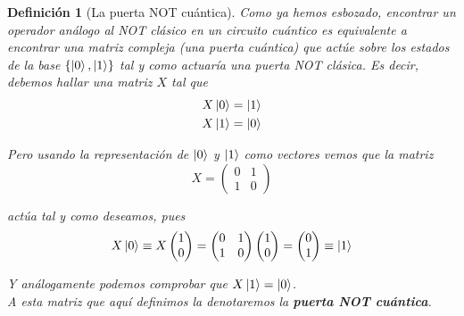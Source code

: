 \documentclass[11pt, spanish]{report}
\numberwithin{equation}{section}
\newtheorem{defin}{Definición}[section]
\numberwithin{defin}{section}
\begin{document}
\begin{defin}[La puerta NOT cuántica] Como ya hemos esbozado, encontrar un operador análogo al NOT clásico en un circuito cuántico es equivalente a encontrar una matriz compleja (una puerta cuántica) que actúe sobre los estados de la base $\{\ket{0},\ket{1}\}$ tal y como actuaría una puerta NOT clásica. Es decir, debemos hallar una matriz $X$ tal que
\begin{equation}
\begin{split}
X\ket{0}=\ket{1}\\
X\ket{1}=\ket{0}
\end{split}
\end{equation}

Pero usando la representación de $\ket{0}$ y $\ket{1}$ como vectores vemos que la matriz
\begin{equation}
X=\begin{pmatrix}
0 & 1\\
1& 0
\end{pmatrix}
\end{equation}

\noindent actúa tal y como deseamos, pues \begin{equation}
X\ket{0}\equiv X\begin{pmatrix} 1 \\ 0 \end{pmatrix}=\begin{pmatrix}0 & 1\\ 1& 0\end{pmatrix}\begin{pmatrix} 1 \\ 0 \end{pmatrix}=\begin{pmatrix}
0 \\ 1
\end{pmatrix}\equiv\ket{1}
\end{equation}

Y análogamente podemos comprobar que $X\ket{1}=\ket{0}$.\\

A esta matriz que aquí definimos la denotaremos la \textbf{puerta NOT cuántica}.

\end{defin}
\end{document}

